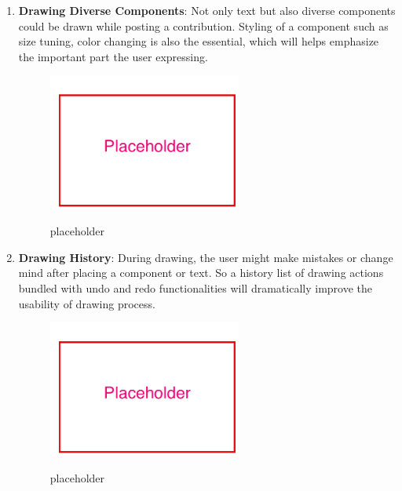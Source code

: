 \begin{enumerate}
\item
\textbf{Drawing Diverse Components}: Not only text but also diverse components could be drawn while posting a contribution. Styling of a component such as size tuning, color changing is also the essential, which will helps emphasize the important part the user expressing.

\begin{figure}[!htbp]
  \caption{placeholder}
  \centering
    \includegraphics[width=0.6\textwidth]{Figures/placeholder.png}
  \label{fig:placeholder}
\end{figure}

\item
\textbf{Drawing History}: During drawing, the user might make mistakes or change mind after placing a component or text. So a history list of drawing actions bundled with undo and redo functionalities will dramatically improve the usability of drawing process.

\begin{figure}[!htbp]
  \caption{placeholder}
  \centering
    \includegraphics[width=0.6\textwidth]{Figures/placeholder.png}
  \label{fig:placeholder}
\end{figure}


\end{enumerate}


